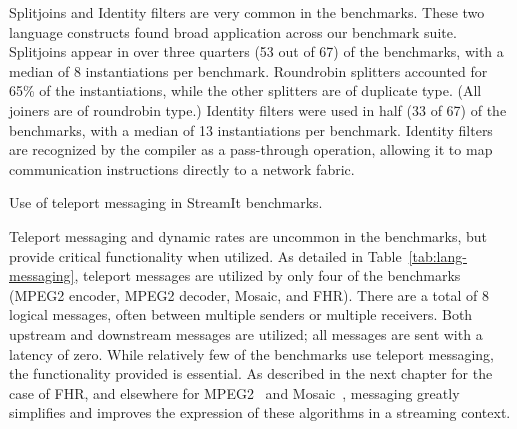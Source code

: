 
\item {\boldit Splitjoins and Identity filters are very common in the 
benchmarks.}  These two language constructs found broad application
across our benchmark suite.  Splitjoins appear in over three quarters
(53 out of 67) of the benchmarks, with a median of 8 instantiations
per benchmark.  Roundrobin splitters accounted for 65\% of the
instantiations, while the other splitters are of duplicate type.  (All
joiners are of roundrobin type.)  Identity filters were used in half
(33 of 67) of the benchmarks, with a median of 13 instantiations per
benchmark.  Identity filters are recognized by the compiler as a
pass-through operation, allowing it to map communication instructions
directly to a network fabric.

\begin{table}[t!]
\caption{Use of teleport messaging in StreamIt 
benchmarks.\protect\label{tab:lang-messaging}}
\end{table}

\item {\boldit Teleport messaging and dynamic rates are uncommon in 
the benchmarks, but provide critical functionality when utilized.}  As
detailed in Table~\ref{tab:lang-messaging}, teleport messages are
utilized by only four of the benchmarks (MPEG2 encoder, MPEG2 decoder,
Mosaic, and FHR).  There are a total of 8 logical messages, often
between multiple senders or multiple receivers.  Both upstream and
downstream messages are utilized; all messages are sent with a latency
of zero.  While relatively few of the benchmarks use teleport
messaging, the functionality provided is essential.  As described in
the next chapter for the case of FHR, and elsewhere for
MPEG2~\cite{drake-thesis} and Mosaic~\cite{aziz-thesis}, messaging
greatly simplifies and improves the expression of these algorithms in
a streaming context.

